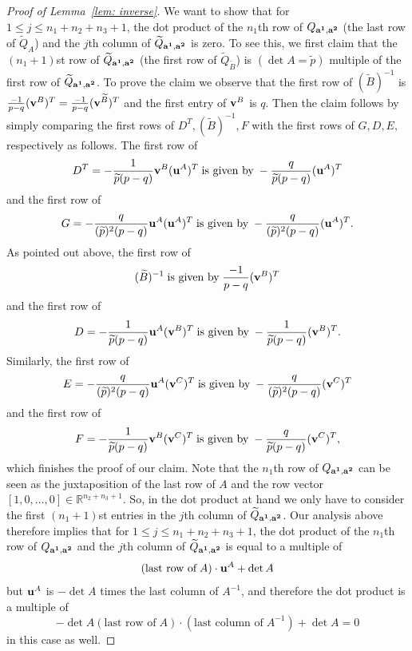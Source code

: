 \documentclass[10pt,a4paper]{amsart}
\begin{document}
\begin{proof} [Proof of Lemma~\ref{lem: inverse}]
We want to show  that for $1 \leq j \leq n_1+n_2+n_3+1$, the dot product of the $n_1$th row of $Q_{{\bf a^1}, {\bf a^2}}$ (the last row of $\widetilde{Q}_A$) and the $j$th  column of $\widetilde{Q}_{{\bf a^1}, {\bf a^2}}$ is zero. To see this,  we first claim that the $(n_1+1)$st row of  $\widetilde{Q}_{{\bf a^1}, {\bf a^2}}$ (the first row of $\widetilde{Q}_{\widetilde{B}}$) is $(\det A=\widetilde{p})$ multiple of the first row of $\widetilde{Q}_{{\bf a^1}, {\bf a^2}}$. To prove the claim we observe that the first row of $(\widetilde{B})^{-1}$ is $\frac{-1}{p-q} ({\bf v}^B)^T=\frac{-1}{p-q} ({\bf v}^{\widetilde{B}})^T$ and the first entry of ${\bf v}^B$ is $q$. Then the  claim follows by simply comparing the first rows of  $D^T, (\widetilde{B})^{-1}, F$   with the first rows of $G, D, E,$ respectively as follows. The first row of $$D^T = -\dfrac{1}{\widetilde{p} (p-q)}   {\bf v}^B ({\bf u}^A)^T \; \mbox{is given by} \;    -\dfrac{q}{\widetilde{p} (p-q)} ({\bf u}^A)^T$$ and the first row of $$G= -\dfrac{q}{(\widetilde{p})^2(p-q)}  {\bf u}^A ( {\bf u}^A)^T \; \mbox{is given by} \;   -\dfrac{q}{(\widetilde{p})^2(p-q)} ( {\bf u}^A)^T.$$ As pointed out above, the first row of 
$$(\widetilde{B})^{-1}  \; \mbox{is given by} \; \frac{-1}{p-q} ({\bf v}^B)^T$$ and the first row of $$D = -\dfrac{1}{\widetilde{p} (p-q)}  {\bf u}^A ({\bf v}^B)^T   \; \mbox{is given by} \;    -\dfrac{1}{\widetilde{p} (p-q)} ({\bf v}^B)^T.$$ Similarly,  the first row of $$E = -\dfrac{q}{(\widetilde{p})^2(p-q)}   {\bf u}^A  ({\bf v}^C)^T \; \mbox{is given by} \;    -\dfrac{q}{(\widetilde{p})^2(p-q)} ({\bf v}^C)^T$$ and the first row of $$F=  -\dfrac{1}{\widetilde{p} (p-q)}   {\bf v}^B ({\bf v}^C)^T \; \mbox{is given by} \;   -\dfrac{q}{\widetilde{p} (p-q)} ({\bf v}^C)^T,$$ which finishes the proof of our claim. Note that the $n_1$th row of $Q_{{\bf a^1}, {\bf a^2}}$  can be seen as the  juxtaposition of the last row of $A$ and the row vector $[1, 0, \dots, 0] \in \mathbb{R}^{n_2+n_3+1}$. So, in the dot product at hand we only have to consider the first $(n_1+1)$st entries  in the $j$th column of $\widetilde{Q}_{{\bf a^1}, {\bf a^2}}$. Our analysis above therefore implies that for $1 \leq j \leq n_1+n_2+n_3+1$, the dot product of the $n_1$th row of $Q_{{\bf a^1}, {\bf a^2}}$ and the $j$th column of $\widetilde{Q}_{{\bf a^1}, {\bf a^2}}$ is equal to a multiple of $$(\mbox{last row of}\; A) \cdot {\bf u}^A + \det A$$ but ${\bf u}^A$ is $-\det A$ times the last column of $A^{-1}$, and therefore the dot product is a multiple of 
$$-\det A (\mbox{last row of}\; A) \cdot (\mbox{last column of}\; A^{-1} )+ \det A=0$$
 in this case as well.  


\end{proof}
\end{document}
